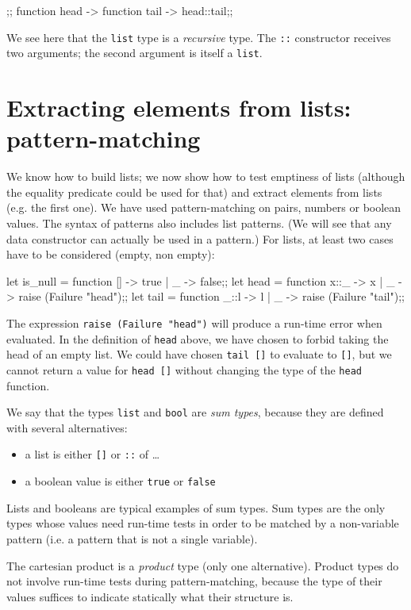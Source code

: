 \begin{caml_example}
[];;
function head -> function tail -> head::tail;;
\end{caml_example}
We see here that the {\tt list} type is a {\it recursive} type.
The \verb"::" constructor receives two arguments; the second argument is itself a {\tt list}.

\section{Extracting elements from lists: pattern-matching}

We know how to build lists; we now show how to test emptiness of lists
(although  the equality predicate could be used for that) and extract
elements from lists (e.g. the first one).
We have used pattern-matching  on pairs, numbers or boolean
values. The syntax of patterns also includes list patterns. (We will
see that any data constructor can actually be used in a pattern.)
For lists, at least two cases have to be considered (empty, non empty):
\begin{caml_example}
let is_null = function [] -> true | _ -> false;;
let head = function x::_ -> x
                  | _ -> raise (Failure "head");;
let tail = function _::l -> l
                  | _ -> raise (Failure "tail");;
\end{caml_example}
The expression \verb|raise (Failure "head")| will produce a
run-time error when evaluated. In the definition of \verb"head" above,
we have chosen to forbid taking the head of an empty list. We could have
chosen \verb"tail []" to evaluate to \verb"[]", but we cannot return a value
for \verb"head []" without changing the type of the \verb"head" function.


We say that the types {\tt list} and {\tt bool} are {\it sum types},
because they are defined  with several alternatives:
\begin{itemize}
\item a list is either \verb"[]" or \verb"::" of \ldots
\item a boolean value is either \verb"true" or \verb"false"
\end{itemize}

Lists and booleans are typical examples of sum types. Sum types are
the only types whose values need run-time tests in order to be matched
by a non-variable pattern (i.e. a pattern that is not a single variable).


The cartesian product is a {\it product} type (only one alternative).
Product types do not involve run-time tests during pattern-matching,
because the type of their values suffices to indicate statically
what their structure is.

